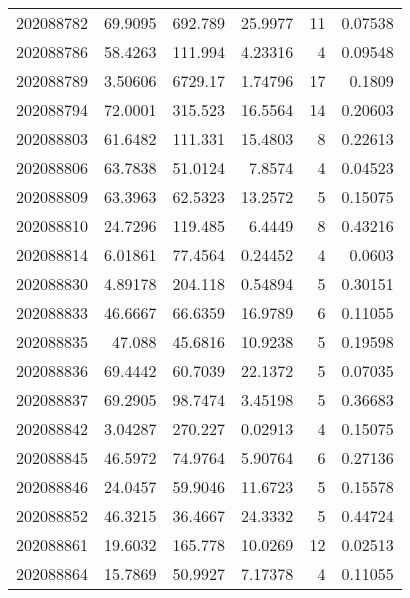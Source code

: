 \begin{tabular}{rrrrrr}
 202088782 &         69.9095  &      692.789  &           25.9977  &          11 & 0.07538 \\
 202088786 &         58.4263  &      111.994  &            4.23316 &           4 & 0.09548 \\
 202088789 &          3.50606 &     6729.17   &            1.74796 &          17 & 0.1809  \\
 202088794 &         72.0001  &      315.523  &           16.5564  &          14 & 0.20603 \\
 202088803 &         61.6482  &      111.331  &           15.4803  &           8 & 0.22613 \\
 202088806 &         63.7838  &       51.0124 &            7.8574  &           4 & 0.04523 \\
 202088809 &         63.3963  &       62.5323 &           13.2572  &           5 & 0.15075 \\
 202088810 &         24.7296  &      119.485  &            6.4449  &           8 & 0.43216 \\
 202088814 &          6.01861 &       77.4564 &            0.24452 &           4 & 0.0603  \\
 202088830 &          4.89178 &      204.118  &            0.54894 &           5 & 0.30151 \\
 202088833 &         46.6667  &       66.6359 &           16.9789  &           6 & 0.11055 \\
 202088835 &         47.088   &       45.6816 &           10.9238  &           5 & 0.19598 \\
 202088836 &         69.4442  &       60.7039 &           22.1372  &           5 & 0.07035 \\
 202088837 &         69.2905  &       98.7474 &            3.45198 &           5 & 0.36683 \\
 202088842 &          3.04287 &      270.227  &            0.02913 &           4 & 0.15075 \\
 202088845 &         46.5972  &       74.9764 &            5.90764 &           6 & 0.27136 \\
 202088846 &         24.0457  &       59.9046 &           11.6723  &           5 & 0.15578 \\
 202088852 &         46.3215  &       36.4667 &           24.3332  &           5 & 0.44724 \\
 202088861 &         19.6032  &      165.778  &           10.0269  &          12 & 0.02513 \\
 202088864 &         15.7869  &       50.9927 &            7.17378 &           4 & 0.11055 \\

\end{tabular}
